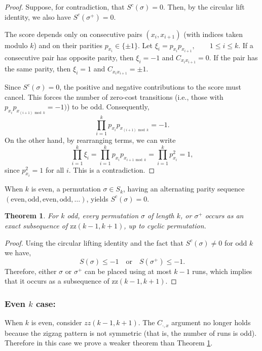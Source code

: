 \documentclass[a4paper,12pt]{article}
\newtheorem{theorem}{Theorem}[section]
\theoremstyle{definition}
\numberwithin{equation}{section}
\begin{document}
\begin{proof}
Suppose, for contradiction, that $S^c(\sigma)=0$. Then, by the circular lift identity, we also have $S^c(\sigma^+)=0$.

The score depends only on consecutive pairs $(x_i,x_{i+1})$ (with indices taken modulo $k$) and on their parities $p_{x_i}\in\{\pm1\}$.  Let $\xi_i = p_{x_i}p_{x_{i+1}}, \qquad 1\le i\le k.$ If a consecutive pair has opposite parity, then $\xi_i=-1$ and $C_{x_i x_{i+1}}=0$.  If the pair has the same parity, then $\xi_i=1$ and $C_{x_i x_{i+1}}=\pm1$.

Since $S^c(\sigma)=0$, the positive and negative contributions to the score must cancel. This forces the number of zero-cost transitions (i.e., those with $p_{x_i}p_{x_{(i+1)\bmod k}}=-1)$) to be odd. Consequently,
\[
\prod_{i=1}^k p_{x_i}p_{x_{(i+1)\bmod k}} = -1.
\]
On the other hand, by rearranging terms, we can write
\[
\prod_{i=1}^k \xi_i
   = \prod_{i=1}^k p_{x_i}p_{x_{i+1 \bmod k}}
   = \prod_{i=1}^k p_{x_i}^2
   = 1,
\]
since $p_{x_i}^2=1$ for all $i$. This is a contradiction.
\end{proof}

When $k$ is even, a permutation $\sigma\in S_k$, having an alternating parity sequence $(\text{even}, \text{odd}, \text{even}, \text{odd}, \dots)$, yields $S^c(\sigma) = 0$. 

\begin{theorem}\label{exactsubseq}
For $k$ odd, every permutation $\sigma$ of length $k$, or $\sigma^+$ occurs as an exact subsequence of $\mathrm{zz}(k-1,k+1)$, up to cyclic permutation.
\end{theorem}

\begin{proof}
Using the circular lifting identity and the fact that $S^c(\sigma)\neq 0$ for odd $k$ we have,
\[
S(\sigma)\le -1 \quad \text{or} \quad S(\sigma^+)\le -1.
\]
Therefore, either $\sigma$ or $\sigma^+$ can be placed using at most $k-1$ runs, which implies that it occurs as a subsequence of $\mathrm{zz}(k-1,k+1)$.
\end{proof}
\subsubsection{Even $k$ case:}

When $k$ is even, consider $zz(k-1,k+1)$. The $C_{\cdot,x}$ argument no longer holds because the zigzag pattern is not symmetric (that is, the number of runs is odd). Therefore in this case we prove a weaker theorem than Theorem \ref{exactsubseq}.\\
\end{document}
